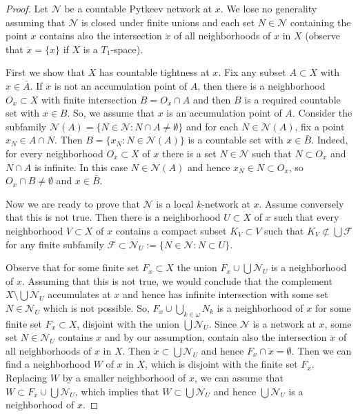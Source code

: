 \documentclass{amsart}
\theoremstyle{definition}
\begin{document}
\begin{proof} Let $\mathcal N$ be a countable Pytkeev network at $x$. We lose no generality assuming that $\mathcal N$ is closed under finite unions and each set $N\in\mathcal N$ containing the point $x$ contains also the intersection $\ddot x$ of all neighborhoods of $x$ in $X$ (observe that $\ddot x=\{x\}$ if $X$ is a $T_1$-space).

First we show that $X$ has countable tightness at $x$. Fix any subset $A\subset X$ with $x\in\bar A$. If $x$ is not an accumulation point of $A$, then there is a neighborhood $O_x\subset X$ with finite intersection $B=O_x\cap A$ and then $B$ is a required countable set with $x\in B$. So, we assume that $x$ is an accumulation point of $A$. Consider the subfamily $\mathcal N(A)=\{N\in\mathcal N:N\cap A\ne\emptyset\}$ and for each $N\in\mathcal N(A)$, fix a point $x_N\in A\cap N$. Then $B=\{x_N:N\in\mathcal N(A)\}$ is a countable set with $x\in \bar B$. Indeed, for every neighborhood $O_x\subset X$ of $x$ there is a set $N\in\mathcal N$ such that $N\subset O_x$ and $N\cap A$ is infinite. In this case $N\in\mathcal N(A)$ and hence $x_N\in N\subset O_x$, so $O_x\cap B\ne\emptyset$ and $x\in \bar B$.
\smallskip

Now we are ready to prove that $\mathcal N$ is a local $k$-network at $x$. Assume conversely that this is not true.
Then there is a neighborhood $U\subset X$ of $x$ such that every neighborhood $V\subset X$ of $x$ contains a compact subset $K_V\subset V$ such that $K_V\not\subset \bigcup{\mathcal F}$ for any finite subfamily ${\mathcal F}\subset\mathcal N_U:=\{N\in\mathcal N:N\subset U\}$.

Observe that for some finite set $F_x\subset X$ the union $F_x\cup\bigcup\mathcal N_U$ is a neighborhood of $x$. Assuming that this is not true, we would conclude that the complement $X\setminus \bigcup\mathcal N_U$ accumulates at $x$ and hence has infinite intersection with some set $N\in\mathcal N_U$ which is not possible. So, $F_x\cup\bigcup_{k\in{\omega}}N_k$ is a neighborhood of $x$ for some finite set $F_x\subset X$, disjoint with the union $\bigcup\mathcal N_U$. Since $\mathcal N$ is a network at $x$, some set $N\in\mathcal N_U$ contains $x$ and by our assumption, contain also the intersection $\ddot x$ of all neighborhoods of $x$ in $X$. Then $\ddot x\subset \bigcup\mathcal N_U$ and hence $F_x\cap\ddot x=\emptyset$. Then we can find a neighborhood $W$ of $x$ in $X$, which is disjoint with the finite set $F_x$. Replacing $W$ by a smaller neighborhood of $x$, we can assume that $W\subset F_x\cup\bigcup\mathcal N_U$, which implies that $W\subset \bigcup\mathcal N_U$ and hence $\bigcup\mathcal N_U$ is a neighborhood of $x$.


\end{proof}
\end{document}
